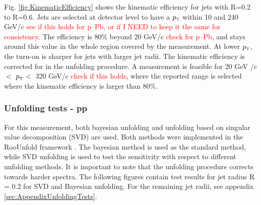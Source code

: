 \documentclass[ALICE]{ALICE_analysis_notes}
\newcommand{\pT}{$p_{\mbox{\tiny T}}$\xspace}
\newcommand{\pPb}{{\mbox{p--Pb}}\xspace}
\newcommand{\pp}{pp\xspace}
\begin{document}
Fig. \ref{fig:KinematicEfficiency} shows the kinematic efficiency for jets with R=0.2 to R=0.6. Jets are selected at detector level to have a \pT within 10 and 240 GeV/c \textcolor{red}{see if this holds for \pPb, or if I NEED to keep it the same for consistency}. The efficiency is 80$\%$ beyond 20 GeV/c \textcolor{red}{check for \pPb}, and stays around this value in the whole region covered by the measurement. At lower \pT, the turn-on is sharper for jets with larger jet radii. The kinematic efficiency is corrected for in the unfolding procedure. A measurement is feasible for 20 GeV /c $<$ \pT $<$ 320 GeV/c \textcolor{red}{check if this holds}, where the reported range is selected where the kinematic efficiency is larger than 80$\%$.

\subsubsection{Unfolding tests - \pp}
\label{subsec:unfoldingTests}

For this measurement, both bayesian unfolding and unfolding based on singular value decomposition (SVD) are used. Both methods were implemented in the RooUnfold framework \cite{roounfold}. The bayesian method is used as the standard method, while SVD unfolding is used to test the sensitivity with respect to different unfolding methods. It is important to note that the unfolding procedure corrects towards harder spectra. The following figures contain test results for jet radius R = 0.2 for SVD and Bayesian unfolding. For the remaining jet radii, see appendix \ref{sec:AppendixUnfoldingTests}.
\end{document}
